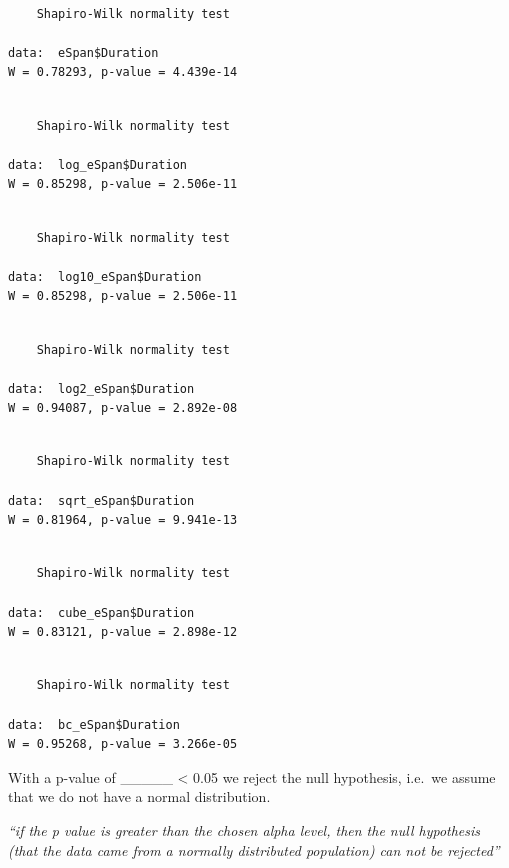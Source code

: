 \documentclass[
  letterpaper,
  DIV=11,
  numbers=noendperiod]{scrartcl}
\begin{document}
\begin{verbatim}

    Shapiro-Wilk normality test

data:  eSpan$Duration
W = 0.78293, p-value = 4.439e-14
\end{verbatim}

\begin{verbatim}

    Shapiro-Wilk normality test

data:  log_eSpan$Duration
W = 0.85298, p-value = 2.506e-11
\end{verbatim}

\begin{verbatim}

    Shapiro-Wilk normality test

data:  log10_eSpan$Duration
W = 0.85298, p-value = 2.506e-11
\end{verbatim}

\begin{verbatim}

    Shapiro-Wilk normality test

data:  log2_eSpan$Duration
W = 0.94087, p-value = 2.892e-08
\end{verbatim}

\begin{verbatim}

    Shapiro-Wilk normality test

data:  sqrt_eSpan$Duration
W = 0.81964, p-value = 9.941e-13
\end{verbatim}

\begin{verbatim}

    Shapiro-Wilk normality test

data:  cube_eSpan$Duration
W = 0.83121, p-value = 2.898e-12
\end{verbatim}

\begin{verbatim}

    Shapiro-Wilk normality test

data:  bc_eSpan$Duration
W = 0.95268, p-value = 3.266e-05
\end{verbatim}

With a p-value of \_\_\_\_\_ \textless{} 0.05 we reject the null
hypothesis, i.e.~we assume that we do not have a normal distribution.

\emph{``if the p value is greater than the chosen alpha level, then the
null hypothesis (that the data came from a normally distributed
population) can not be rejected''}
\end{document}
